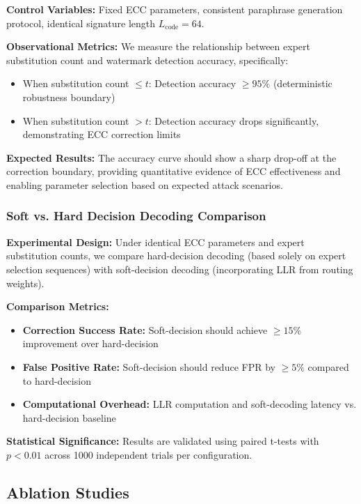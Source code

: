 \textbf{Control Variables:} Fixed ECC parameters, consistent paraphrase generation protocol, identical signature length $L_{\text{code}} = 64$.

\textbf{Observational Metrics:} We measure the relationship between expert substitution count and watermark detection accuracy, specifically:
\begin{itemize}
\item When substitution count $\leq t$: Detection accuracy $\geq 95\%$ (deterministic robustness boundary)
\item When substitution count $> t$: Detection accuracy drops significantly, demonstrating ECC correction limits
\end{itemize}

\textbf{Expected Results:} The accuracy curve should show a sharp drop-off at the correction boundary, providing quantitative evidence of ECC effectiveness and enabling parameter selection based on expected attack scenarios.

\subsubsection{Soft vs. Hard Decision Decoding Comparison}

\textbf{Experimental Design:} Under identical ECC parameters and expert substitution counts, we compare hard-decision decoding (based solely on expert selection sequences) with soft-decision decoding (incorporating LLR from routing weights).

\textbf{Comparison Metrics:}
\begin{itemize}
\item \textbf{Correction Success Rate:} Soft-decision should achieve $\geq 15\%$ improvement over hard-decision
\item \textbf{False Positive Rate:} Soft-decision should reduce FPR by $\geq 5\%$ compared to hard-decision
\item \textbf{Computational Overhead:} LLR computation and soft-decoding latency vs. hard-decision baseline
\end{itemize}

\textbf{Statistical Significance:} Results are validated using paired t-tests with $p < 0.01$ across 1000 independent trials per configuration.

\subsection{Ablation Studies}

